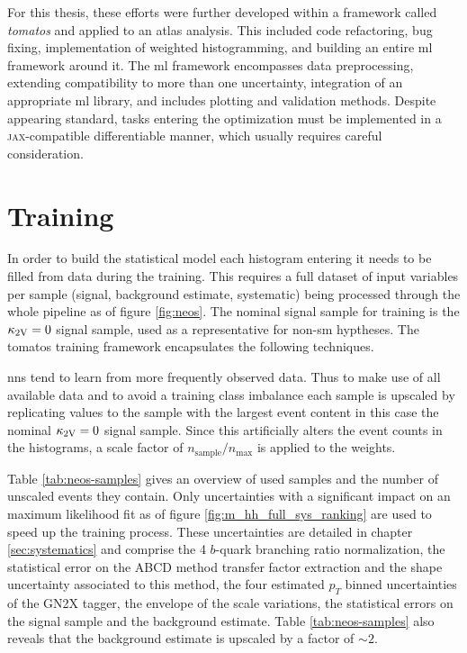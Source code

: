 For this thesis, these efforts were further developed within a framework called \textit{\acf{tomatos}} \citep{tomatos} and applied to an \ac{atlas} analysis. This included code refactoring, bug fixing, implementation of weighted histogramming, and building an entire \ac{ml} framework around it. The \ac{ml} framework encompasses data preprocessing, extending compatibility to more than one uncertainty, integration of an appropriate \ac{ml} library, and includes plotting and validation methods. Despite appearing standard, tasks entering the optimization must be implemented in a \textsc{jax}-compatible differentiable manner, which usually requires careful consideration.


\section{Training}\label{sec:neos_training}
In order to build the statistical model each histogram entering it needs to be filled from data during the training. This requires a full dataset of input variables per sample (signal, background estimate, systematic) being processed through the whole pipeline as of figure \ref{fig:neos}. The nominal signal sample for training is the $\kappa_{\text{2V}}=0$ signal sample, used as a representative for non-\ac{sm} \ktwov hyptheses. The \ac{tomatos} \citep{tomatos} training framework encapsulates the following techniques.

\acp{nn} tend to learn from more frequently observed data. Thus to make use of all available data and to avoid a training class imbalance each sample is upscaled by replicating values to the sample with the largest event content in this case the nominal $\kappa_{\text{2V}}=0$ signal sample. Since this artificially alters the event counts in the histograms, a scale factor of $n_\text{sample}/n_\text{max}$ is applied to the weights.

Table \ref{tab:neos-samples} gives an overview of used samples and the number of unscaled events they contain. Only uncertainties with a significant impact on an \mhh{} maximum likelihood fit as of figure \ref{fig:m_hh_full_sys_ranking} are used to speed up the training process. These uncertainties are detailed in chapter \ref{sec:systematics} and comprise the 4 $b$-quark branching ratio normalization, the statistical error on the ABCD method transfer factor extraction and the shape uncertainty associated to this method, the four estimated $p_T$ binned uncertainties of the GN2X tagger, the envelope of the scale variations, the statistical errors on the \ktwov signal sample and the background estimate. Table \ref{tab:neos-samples} also reveals that the background estimate is upscaled by a factor of $\sim 2$. 

